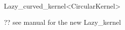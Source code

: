\begin{ccRefClass}{Lazy_curved_kernel<CircularKernel>}

\ccDefinition



\ccParameters

?? see manual for the new Lazy_kernel

\end{ccRefClass}
